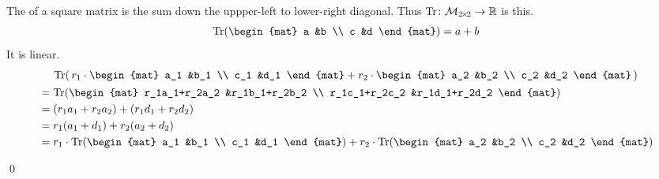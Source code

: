\documentclass[10pt,t,serif,professionalfont]{beamer}
\begin{document}
\begin{frame}
The  of a square matrix 
is the sum down the uppper-left to lower-right diagonal.
Thus
$\mbox{$\operatorname{Tr}\colon \mathcal{M}_{2 \! \times \! 2}\to \mathbb{R}$}$
is this.
\begin{equation*}
  \trace(\begin{mat}
    a &b \\
    c &d
  \end{mat})
  =a+b
\end{equation*}
It is linear.
\begin{multline*}
  \trace(\,
  r_1\cdot\begin{mat}
    a_1 &b_1 \\
    c_1 &d_1
  \end{mat}
  +
  r_2\cdot\begin{mat}
    a_2 &b_2 \\
    c_2 &d_2
  \end{mat}
  \,)                                              \\
  \begin{aligned}
    &=\trace(
      \begin{mat}
        r_1a_1+r_2a_2 &r_1b_1+r_2b_2 \\
        r_1c_1+r_2c_2 &r_1d_1+r_2d_2
      \end{mat}
      )                                       \\
    &=(r_1a_1+r_2a_2)+(r_1d_1+r_2d_2)         \\
    &=r_1(a_1+d_1)+r_2(a_2+d_2)               \\
    &=r_1\cdot\trace(
      \begin{mat}
        a_1 &b_1 \\
        c_1 &d_1
      \end{mat}
      )
      +
      r_2\cdot\trace(
      \begin{mat}
        a_2 &b_2 \\
        c_2 &d_2
      \end{mat}
      )
  \end{aligned} 
\end{multline*}
\end{frame}



\begin{frame}
\th[th:HomoDetActOnBasis]

\pause
\pf
{}

\pause
{}
\end{frame}
\begin{frame}
\qed
\end{frame}
\end{document}
